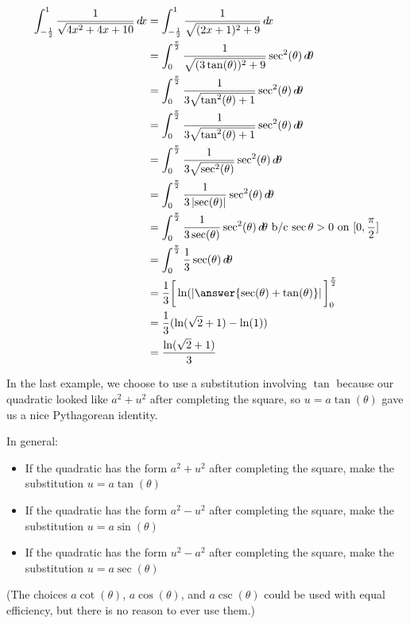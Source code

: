 \documentclass{ximera}
\begin{document}
\begin{example}
\begin{align*}
\int_{-\frac{1}{2}}^1 \frac{1}{\sqrt{4x^2+4x+10}} \d x &= \int_{-\frac{1}{2}}^1 \frac{1}{\sqrt{(2x+1)^2+9}} \d x\\
&= \int_0^\frac{\pi}{2} \frac{1}{\sqrt{(3\tan(\theta))^2+9}} \sec^2(\theta) \d \theta\\
&= \int_0^\frac{\pi}{2} \frac{1}{3\sqrt{\tan^2(\theta)+1}} \sec^2(\theta) \d \theta\\
&= \int_0^\frac{\pi}{2} \frac{1}{3\sqrt{\tan^2(\theta)+1}} \sec^2(\theta) \d \theta\\
&= \int_0^\frac{\pi}{2} \frac{1}{3\sqrt{\sec^2(\theta)}} \sec^2(\theta) \d \theta\\
&= \int_0^\frac{\pi}{2} \frac{1}{3 \left| \sec(\theta) \right|} \sec^2(\theta) \d \theta\\
&= \int_0^\frac{\pi}{2} \frac{1}{3 \sec(\theta)} \sec^2(\theta) \d \theta \textrm{ b/c $\sec{\theta} > 0$ on $[0,\frac{\pi}{2}]$}\\
&= \int_0^\frac{\pi}{2} \frac{1}{3} \sec(\theta) \d \theta\\
&= \frac{1}{3} \eval{\ln(\left| \answer{\sec(\theta)+\tan(\theta)} \right| }_0^\frac{\pi}{2}\\
&=\frac{1}{3} ( \ln(\sqrt{2}+1) - \ln(1))\\
&=\frac{\ln(\sqrt{2}+1)}{3}
\end{align*}
 
\end{example}

In the last example, we choose to use a substitution involving $\tan$ because our quadratic looked like $a^2+u^2$ after completing the square, so $ u = a\tan(\theta)$ gave us a nice Pythagorean identity.

In general:

\begin{itemize}
\item If the quadratic has the form $a^2 + u^2$ after completing the square, make the substitution $u = a\tan(\theta)$
\item If the quadratic has the form $a^2 - u^2$ after completing the square, make the substitution $u = a\sin(\theta)$ 
\item If the quadratic has the form $u^2 - a^2$ after completing the square, make the substitution $u = a\sec(\theta)$
\end{itemize}

(The choices $a\cot(\theta)$,  $a\cos(\theta)$, and $a \csc(\theta)$ could be used with equal efficiency, but there is no reason to ever use them.)
\end{document}
